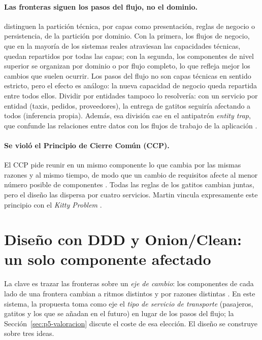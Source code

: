 \paragraph{Las fronteras siguen los pasos del flujo, no el dominio.}
\textcite[cap.~8]{richardsford2020} distinguen la partición técnica, por capas como
presentación, reglas de negocio o persistencia, de la partición por dominio. Con la
primera, los flujos de negocio, que en la mayoría de los sistemas reales atraviesan las
capacidades técnicas, quedan repartidos por todas las capas; con la segunda, los
componentes de nivel superior se organizan por dominio o por flujo completo, lo que
refleja mejor los cambios que suelen ocurrir. Los pasos del flujo no son capas técnicas
en sentido estricto, pero el efecto es análogo: la nueva capacidad de negocio queda
repartida entre todos ellos. Dividir por entidades tampoco lo resolvería: con un servicio
por entidad (taxis, pedidos, proveedores), la entrega de gatitos seguiría afectando a
todos (inferencia propia). Además, esa división cae en el antipatrón \emph{entity trap},
que confunde las relaciones entre datos con los flujos de trabajo de la aplicación
\parencite[cap.~8]{richardsford2020}.

\paragraph{Se violó el Principio de Cierre Común (CCP).}
El CCP pide reunir en un mismo componente lo que cambia por las mismas razones y al mismo
tiempo, de modo que un cambio de requisitos afecte al menor número posible de
componentes \parencite[105--106]{martin2017}. Todas las reglas de los gatitos cambian
juntas, pero el diseño las dispersa por cuatro servicios. Martin vincula expresamente
este principio con el \emph{Kitty Problem} \parencite[106]{martin2017}.

\section{Diseño con DDD y Onion/Clean: un solo componente afectado}
\label{sec:p5-diseno}

La clave es trazar las fronteras sobre un \emph{eje de cambio}: los componentes de cada
lado de una frontera cambian a ritmos distintos y por razones distintas
\parencite[173]{martin2017}. En este sistema, la propuesta toma como eje el \emph{tipo de
servicio de transporte} (pasajeros, gatitos y los que se añadan en el futuro) en lugar de
los pasos del flujo; la Sección~\ref{sec:p5-valoracion} discute el coste de esa elección.
El diseño se construye sobre tres ideas.

